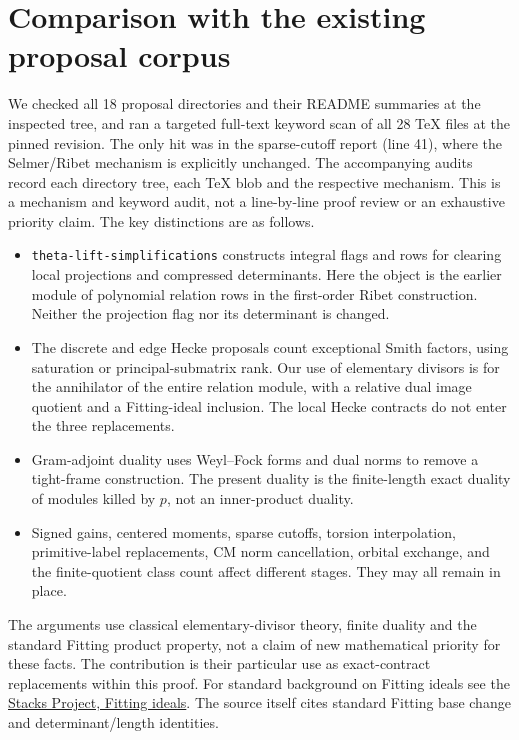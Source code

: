 \documentclass[11pt]{article}
\theoremstyle{remark}\newtheorem{remark}[theorem]{Remark}
\begin{document}
\section{Comparison with the existing proposal corpus}
We checked all 18 proposal directories and their README summaries at the inspected tree, and ran a targeted full-text keyword scan of all 28 TeX files at the pinned revision. The only hit was in the sparse-cutoff report (line 41), where the Selmer/Ribet mechanism is explicitly unchanged. The accompanying audits record each directory tree, each TeX blob and the respective mechanism. This is a mechanism and keyword audit, not a line-by-line proof review or an exhaustive priority claim. The key distinctions are as follows.
\begin{itemize}
\item \texttt{theta-lift-simplifications} constructs integral flags and rows for clearing local projections and compressed determinants. Here the object is the earlier module of polynomial relation rows in the first-order Ribet construction. Neither the projection flag nor its determinant is changed.
\item The discrete and edge Hecke proposals count exceptional Smith factors, using saturation or principal-submatrix rank. Our use of elementary divisors is for the annihilator of the entire relation module, with a relative dual image quotient and a Fitting-ideal inclusion. The local Hecke contracts do not enter the three replacements.
\item Gram-adjoint duality uses Weyl--Fock forms and dual norms to remove a tight-frame construction. The present duality is the finite-length exact duality of modules killed by $p$, not an inner-product duality.
\item Signed gains, centered moments, sparse cutoffs, torsion interpolation, primitive-label replacements, CM norm cancellation, orbital exchange, and the finite-quotient class count affect different stages. They may all remain in place.
\end{itemize}
The arguments use classical elementary-divisor theory, finite duality and the standard Fitting product property, not a claim of new mathematical priority for these facts. The contribution is their particular use as exact-contract replacements within this proof. For standard background on Fitting ideals see the \href{https://stacks.math.columbia.edu/tag/07Z6}{Stacks Project, Fitting ideals}. The source itself cites standard Fitting base change and determinant/length identities.
\end{document}
